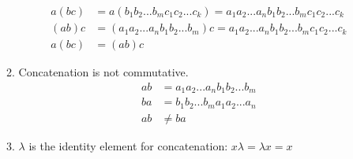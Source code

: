 \begin{enumerate}[label={\Alph*.},font={\bfseries}]
\begin{enumerate}[label={\arabic*},font={\bfseries}]
\begin{align*}
      a(bc) &= a(b_1b_2...b_mc_1c_2...c_k) = a_1a_2...a_nb_1b_2...b_mc_1c_2...c_k \\
      (ab)c &= (a_1a_2...a_nb_1b_2...b_m)c = a_1a_2...a_nb_1b_2...b_mc_1c_2...c_k \\
      a(bc) &= (ab)c
    \end{align*}
  \item Concatenation is not commutative.
    \begin{align*}
      ab &= a_1a_2...a_nb_1b_2...b_m \\
      ba &= b_1b_2...b_ma_1a_2...a_n \\
      ab &\neq ba
    \end{align*}
  \item $\lambda$ is the identity element for concatenation:
    $x\lambda = \lambda{}x = x$
  \end{enumerate}
\end{enumerate}
